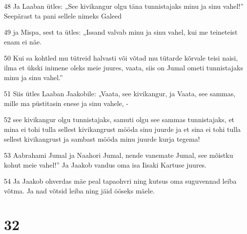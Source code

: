 \par 48 Ja Laaban ütles: „See kivikangur olgu täna tunnistajaks minu ja sinu vahel!” Seepärast ta pani sellele nimeks Galeed
\par 49 ja Mispa, sest ta ütles: „Issand valvab minu ja sinu vahel, kui me teineteist enam ei näe.
\par 50 Kui sa kohtled mu tütreid halvasti või võtad mu tütarde kõrvale teisi naisi, ilma et ükski inimene oleks meie juures, vaata, siis on Jumal ometi tunnistajaks minu ja sinu vahel.”
\par 51 Siis ütles Laaban Jaakobile: „Vaata, see kivikangur, ja Vaata, see sammas, mille ma püstitasin enese ja sinu vahele, -
\par 52 see kivikangur olgu tunnistajaks, samuti olgu see sammas tunnistajaks, et mina ei tohi tulla sellest kivikangrust mööda sinu juurde ja et sina ei tohi tulla sellest kivikangrust ja sambast mööda minu juurde kurja tegema!
\par 53 Aabrahami Jumal ja Naahori Jumal, nende vanemate Jumal, see mõistku kohut meie vahel!” Ja Jaakob vandus oma isa Iisaki Kartuse juures.
\par 54 Ja Jaakob ohverdas mäe peal tapaohvri ning kutsus oma suguvennad leiba võtma. Ja nad võtsid leiba ning jäid ööseks mäele.

\chapter{32}

